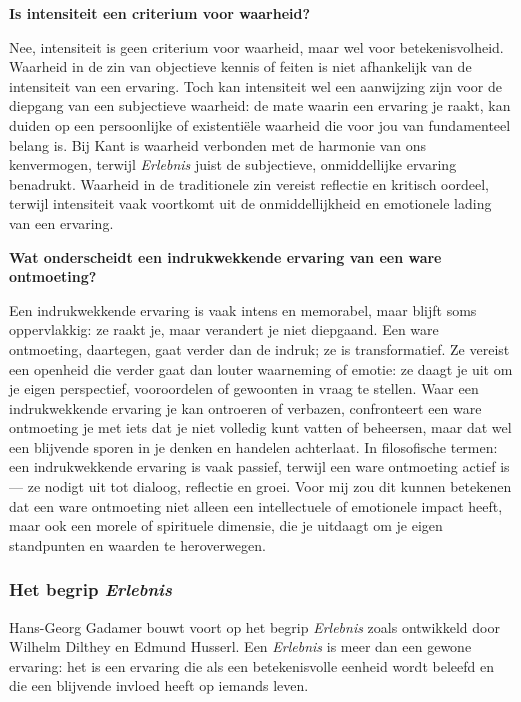 \documentclass[11pt,twoside,openright]{memoir}
\begin{document}
\bigskip
\noindent
\textbf{Is intensiteit een criterium voor waarheid?}
\medskip

Nee, intensiteit is geen criterium voor waarheid, maar wel voor betekenisvolheid. Waarheid in de zin van objectieve kennis of feiten is niet afhankelijk van de intensiteit van een ervaring. Toch kan intensiteit wel een aanwijzing zijn voor de diepgang van een subjectieve waarheid: de mate waarin een ervaring je raakt, kan duiden op een persoonlijke of existentiële waarheid die voor jou van fundamenteel belang is. Bij Kant is waarheid verbonden met de harmonie van ons kenvermogen, terwijl \textit{Erlebnis} juist de subjectieve, onmiddellijke ervaring benadrukt. Waarheid in de traditionele zin vereist reflectie en kritisch oordeel, terwijl intensiteit vaak voortkomt uit de onmiddellijkheid en emotionele lading van een ervaring.

\bigskip
\noindent
\textbf{Wat onderscheidt een indrukwekkende ervaring van een ware ontmoeting?}
\medskip

Een indrukwekkende ervaring is vaak intens en memorabel, maar blijft soms oppervlakkig: ze raakt je, maar verandert je niet diepgaand. Een ware ontmoeting, daartegen, gaat verder dan de indruk; ze is transformatief. Ze vereist een openheid die verder gaat dan louter waarneming of emotie: ze daagt je uit om je eigen perspectief, vooroordelen of gewoonten in vraag te stellen. Waar een indrukwekkende ervaring je kan ontroeren of verbazen, confronteert een ware ontmoeting je met iets dat je niet volledig kunt vatten of beheersen, maar dat wel een blijvende sporen in je denken en handelen achterlaat. In filosofische termen: een indrukwekkende ervaring is vaak passief, terwijl een ware ontmoeting actief is — ze nodigt uit tot dialoog, reflectie en groei. Voor mij zou dit kunnen betekenen dat een ware ontmoeting niet alleen een intellectuele of emotionele impact heeft, maar ook een morele of spirituele dimensie, die je uitdaagt om je eigen standpunten en waarden te heroverwegen.

\subsubsection{Het begrip \textit{Erlebnis}}

Hans-Georg Gadamer bouwt voort op het begrip \textit{Erlebnis} zoals ontwikkeld door Wilhelm Dilthey en Edmund Husserl. Een \textit{Erlebnis} is meer dan een gewone ervaring: het is een ervaring die als een betekenisvolle eenheid wordt beleefd en die een blijvende invloed heeft op iemands leven.
\end{document}
